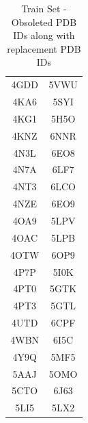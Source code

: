 \documentclass[journal=jcisd8,manuscript=article]{achemso}
\begin{document}
\begin{center}
\begin{table}[ht]
\begin{tabular}{|c|c|}
            4GDD                       & 5VWU                         \\
            4KA6                       & 5SYI                         \\
            4KG1                       & 5H5O                         \\
            4KNZ                       & 6NNR                         \\
            4N3L                       & 6EO8                         \\
            4N7A                       & 6LF7                         \\
            4NT3                       & 6LCO                         \\
            4NZE                       & 6EO9                         \\
            4OA9                       & 5LPV                         \\
            4OAC                       & 5LPB                         \\
            4OTW                       & 6OP9                         \\
            4P7P                       & 5I0K                         \\
            4PT0                       & 5GTK                         \\
            4PT3                       & 5GTL                         \\
            4UTD                       & 6CPF                         \\
            4WBN                       & 6I5C                         \\
            4Y9Q                       & 5MF5                         \\
            5AAJ                       & 5OMO                         \\
            5CTO                       & 6J63                         \\
            5LI5                       & 5LX2                         \\
            \hline
        \end{tabular}
        \caption{Train Set - Obsoleted PDB IDs along with replacement PDB IDs}
        \label{table:trainobsoleted}
    \end{table}
\end{center}
\clearpage
\end{document}
